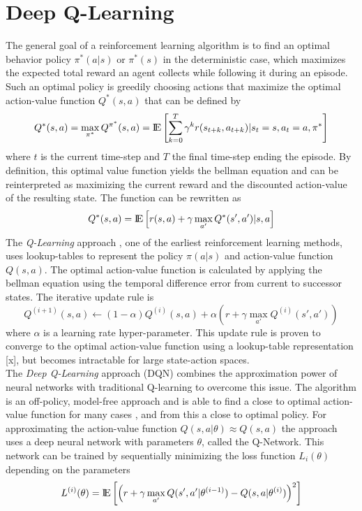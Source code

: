 \section{Deep Q-Learning}
\label{sec:pre}
The general goal of a reinforcement learning algorithm is to find an optimal behavior policy $\pi^*(a|s)$ or $\pi^*(s)$ in the deterministic case, which maximizes the expected total reward an agent collects while following it during an episode. Such an optimal policy is greedily choosing actions that maximize the optimal action-value function $Q^*(s,a)$ that can be defined by 
\[ 
Q^*(s,a)=\max_{\pi^*} Q^{\pi^*}(s,a) =  {\rm I\!E} \left[
\sum_{k=0}^{T}\gamma^{k}r(s_{t+k},a_{t+k})|s_t=s,a_t=a,\pi^*\right] 
\]
where $t$ is the current time-step and $T$ the final time-step ending the episode. By definition, this optimal value function yields the bellman equation \citep{sutton2018reinforcement} and can be reinterpreted as maximizing the current reward and the discounted action-value of the resulting state. The function can be rewritten as
\[
Q^*(s,a) = {\rm I\!E} \left[
r(s,a) + \gamma \max_{a'}Q^*(s',a')|s,a \right]
\]
The \textit{Q-Learning} approach \citep{watkins1992q}, one of the earliest reinforcement learning methods, uses lookup-tables to represent the policy $\pi(a|s)$ and action-value function $Q(s,a)$. The optimal action-value function is calculated by applying the bellman equation using the temporal difference error from current to successor states. The iterative update rule is 
\[
Q^{(i+1)}(s,a) \leftarrow (1-\alpha) Q^{(i)}(s,a) + \alpha \left( r + \gamma \max_{a'} Q^{(i)}(s',a') \right)
\]
where $\alpha$ is a learning rate hyper-parameter. This update rule is proven to converge to the optimal action-value function using a lookup-table representation [x], but becomes intractable for large state-action spaces. \\
The \textit{Deep Q-Learning} approach (DQN) \citep{mnih2013playing} combines the approximation power of neural networks with traditional Q-learning to overcome this issue. The algorithm is an off-policy, model-free approach and is able to find a close to optimal action-value function for many cases \citep{mnih2015human}, and from this a close to optimal policy. For approximating the action-value function $Q(s,a|\theta)\approx Q(s,a)$ the approach uses a deep neural network with parameters $\theta$, called the Q-Network.
This network can be trained by sequentially minimizing the loss function $L_i(\theta)$ depending on the parameters
\[
L^{(i)}(\theta)={\rm I\!E} \left[\left(r+\gamma \max_{a'} Q(s',a'|\theta^{(i-1)})-Q(s,a|\theta^{(i)})\right)^2\right] 
\]
